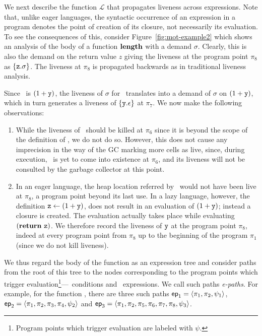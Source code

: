 \documentclass[9pt]{sigplanconf}
\begin{document}
We next  describe the function $\mathcal{L}$  that propagates liveness
across expressions.  Note that,  unlike eager languages, the syntactic
occurrence  of an expression  in a  program denotes  the point  of
creation of its closure, not necessarily its evaluation.
To see the  consequences of this, consider
Figure~\ref{fig:mot-example2} which shows an analysis  of the body of
a function $\mathbf{length}$ with a demand $\sigma$.  Clearly, this is also the
demand on the return value $z$ giving the liveness at the program point
$\pi_8$ as $\{\mbox{\tt z}.\sigma\}$.  The liveness at $\pi_8$ is propagated
backwards as in traditional liveness analysis.

Since   \pz\  is   $(1  +   \mbox{\tt y})$,  the   liveness  of   $\sigma$  for
\pz\ translates into a demand  of $\sigma$ on $(1+\mbox{\tt y})$, which in turn
generates a  liveness of $\{\mbox{\tt y}.\epsilon\}$ at  $\pi_7$.  We now make
the following observations:
\begin{enumerate}
\item While the liveness of \py\  should be killed at $\pi_6$ since it
  is  beyond the scope  of the  definition of  \py, we  do not  do so.
  However, this  does not cause any  imprecision in the way  of the GC
  marking more cells as live,  since, during execution, \py\ is yet to
  come  into  existence at  $\pi_6$,  and  its  liveness will  not  be
  consulted by the garbage collector at this point.
\item In an  eager language, the heap location referred  by \py\ would
  not have been live at $\pi_8$,  a program point beyond its last use.
  In  a  lazy  language,   however,  the  definition  $\mbox{\tt z}  \leftarrow
  (1+\mbox{\tt y})$, does not  result in an evaluation of  $(1+\mbox{\tt y})$; instead a
  closure  is  created.  The  evaluation  actually  takes place  while
  evaluating $(\mbox{$\mathbf{ return}$}~\mbox{\tt z})$.   We therefore  record the  liveness of
  $\mbox{\tt y}$ at  the program point  $\pi_8$, indeed at every  program point
  from $\pi_8$ up to the beginning of the program $\pi_1$ (since we do
  not kill liveness).
\end{enumerate}



We thus  regard the  body of  the function as  an expression  tree and
consider paths from  the root of this tree to  the nodes corresponding
to the program points which trigger evaluation\footnote{Program points
  which      trigger      evaluation       are      labeled      with
  $\psi$.}---\SIF\ conditions and \SRETURN\ expressions.  We call such
paths {\em e-paths}.  For example, for the function \length, there are
three  such paths  $\mathsf{ep}_1 =  \langle \pi_1,  \pi_2, \psi_1\rangle$,
$\mathsf{ep}_2  = \langle\pi_1,  \pi_2,  \pi_3,  \pi_4, \psi_2\rangle$  and
$\mathsf{ep}_3  =  \langle  \pi_1,   \pi_2,  \pi_5,  \pi_6,  \pi_7,  \pi_8,
\psi_3\rangle$.
\end{document}
